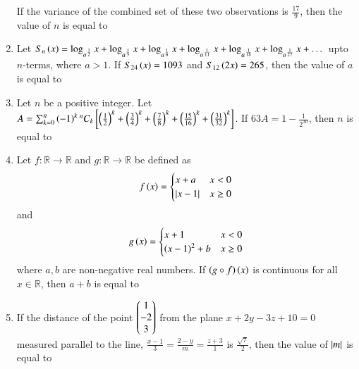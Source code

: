\documentclass[journal,onecolumn]{IEEEtran}
\theoremstyle{remark}
\begin{document}
\begin{enumerate}
	\begin{table}[h!]
		\centering
		
		\label{taba1.q23}
	\end{table}

	If the variance of the combined set of these two observations is $\frac{17}{9}$, then the value of $n$ is equal to

    \item Let $S_n\left(x\right) = \log_{a^{\frac{1}{2}}} x + \log_{a^{\frac{1}{3}}} x + \log_{a^{\frac{1}{6}}} x + \log_{a^{\frac{1}{11}}} x + \log_{a^{\frac{1}{18}}} x + \log_{a^{\frac{1}{27}}} x + \dots$ upto $n$-terms, where $a>1$. If $S_{24}\left(x\right) = 1093$ and $S_{12}\left(2x\right) = 265$, then the value of $a$ is equal to

    \item Let $n$ be a positive integer. Let $A = \sum^{n}_{k = 0}\left(-1\right)^k {}^{n}C_k{}\left[\left(\frac{1}{2}\right)^k + \left(\frac{3}{4}\right)^k + \left(\frac{7}{8}\right)^k + \left(\frac{15}{16}\right)^k + \left(\frac{31}{32}\right)^k\right]$. If $63A = 1 - \frac{1}{2^{30}}$, then $n$ is equal to

    \item Let $f \colon \mathbb{R} \to \mathbb{R}$ and $g \colon \mathbb{R} \to \mathbb{R}$ be defined as
	\begin{align*}
		f\left(x\right) = 
		\begin{cases}
			x + a & x < 0\\
			\left\vert x - 1\right\vert & x \geq 0\\
		\end{cases}
	\end{align*} and
	\begin{align*}
		g\left(x\right) = 
		\begin{cases}
			x + 1 & x < 0\\
			\left(x - 1\right)^2 + b & x \geq 0\\
		\end{cases}
	\end{align*}
	where $a, b$ are non-negative real numbers. If $\left(g \circ f\right)\left(x\right)$ is continuous for all $x \in \mathbb{R}$, then $a + b$ is equal to

    \item If the distance of the point $\begin{pmatrix}1\\-2\\3\end{pmatrix}$ from the plane $x + 2y - 3z + 10 = 0$ measured parallel to the line, $\frac{x - 1}{3} = \frac{2 - y}{m} = \frac{z + 3}{1}$ is $\frac{\sqrt{7}}{2}$, then the value of $\left\vert m\right\vert$ is equal to


\end{enumerate}
\end{document}
